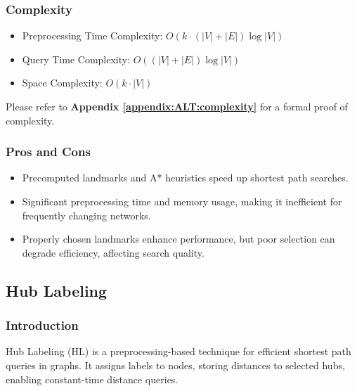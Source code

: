 		\subsubsection{Complexity}
				\begin{itemize}
					\item Preprocessing Time Complexity: $ O(k \cdot (|V| + |E|) \log |V|) $
					\item Query Time Complexity: $ O((|V| + |E|) \log |V|)$
					\item Space Complexity: $O(k \cdot |V|)$
				\end{itemize}
				Please refer to \textbf{Appendix \ref{appendix:ALT:complexity}} for a formal proof of complexity.
				
		\subsubsection{Pros and Cons}
		\begin{itemize}
			\item Precomputed landmarks and A* heuristics speed up shortest path searches.
			\item Significant preprocessing time and memory usage, making it inefficient for frequently changing networks.
			\item Properly chosen landmarks enhance performance, but poor selection can degrade efficiency, affecting search quality.
		\end{itemize}
	\subsection{Hub Labeling}
		\subsubsection{Introduction}
		Hub Labeling (HL) is a preprocessing-based technique for efficient shortest path queries in graphs. It assigns labels to nodes, storing distances to selected hubs, enabling constant-time distance queries.
		
